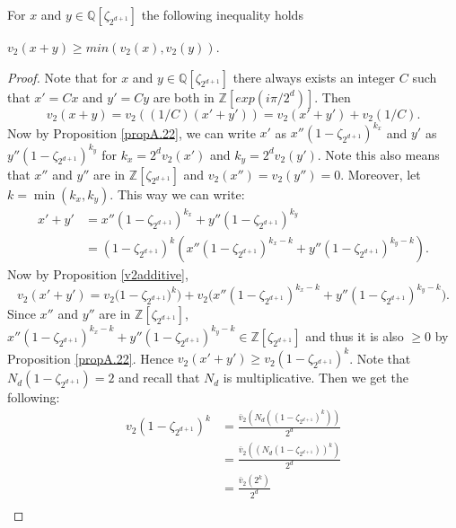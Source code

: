 \documentclass[12pt]{dalthesis}
\begin{document}
\begin{proposition}
\label{v_2min}
For $x$ and $y \in \mathbb{Q}[\zeta_{2^{d+1}}]$ the following inequality holds
\begin{center}
$v_2 (x + y) \geq min(v_2 (x), v_2(y))$.
\end{center} 
\end{proposition}
\begin{proof}
Note that for $x$ and $y \in \mathbb{Q}[\zeta_{2^{d+1}}]$ there always exists an integer $C$ such that $x' = Cx$ and $y' = Cy$ are both in $\mathbb{Z}[exp(i\pi / 2^d)]$. Then 
\begin{equation*}
v_2(x+y) = v_2((1/C)(x' + y')) = v_2(x' + y') + v_2(1/C).
\end{equation*}
Now by Proposition \ref{propA.22}, we can write $x'$ as $x''(1-\zeta_{2^{d+1}})^{k_x}$ and $y'$ as $y''(1-\zeta_{2^{d+1}})^{k_y}$ for $k_x = 2^dv_2(x')$ and $k_y = 2^dv_2(y')$. Note this also means that $x''$ and $y''$ are in $\mathbb{Z}[\zeta_{2^{d+1}}]$ and $v_2(x'') = v_2(y'') = 0$. Moreover, let $k = \min(k_x, k_y)$. This way we can write:
\begin{equation*}
\begin{split}
x'+y' & = x''(1-\zeta_{2^{d+1}})^{k_x} + y''(1-\zeta_{2^{d+1}})^{k_y} \\
& = (1-\zeta_{2^{d+1}})^k (x''(1-\zeta_{2^{d+1}})^{k_x - k} + y''(1-\zeta_{2^{d+1}})^{k_y - k}).
\end{split}
\end{equation*}
Now by Proposition \ref{v2additive}, 
\begin{equation*}
v_2(x' + y') = v_2\big( 1-\zeta_{2^{d+1}})^k) + v_2(x''(1-\zeta_{2^{d+1}})^{k_x - k} + y''(1-\zeta_{2^{d+1}})^{k_y - k} \big).
\end{equation*}
Since $x''$ and $y''$ are in $\mathbb{Z}[\zeta_{2^{d+1}}]$, $x''(1-\zeta_{2^{d+1}})^{k_x - k} + y''(1-\zeta_{2^{d+1}})^{k_y - k} \in \mathbb{Z}[\zeta_{2^{d+1}}]$ and thus it is also $\geq 0$ by Proposition \ref{propA.22}. Hence $v_2(x'+y') \geq v_2(1-\zeta_{2^{d+1}})^k$. Note that $N_d (1-\zeta_{2^{d+1}}) = 2$ and recall that $N_d$ is multiplicative. Then we get the following:
\begin{equation*}
\begin{split}
v_2(1-\zeta_{2^{d+1}})^k & = \frac{\bar{v}_2 (N_d((1-\zeta_{2^{d+1}})^k))}{2^d} \\
& = \frac{\bar{v}_2 ((N_d(1-\zeta_{2^{d+1}}))^k)}{2^d} \\
& = \frac{\bar{v}_2 (2^k)}{2^d} \\

\end{split}
\end{equation*}
\end{proof}
\end{document}
